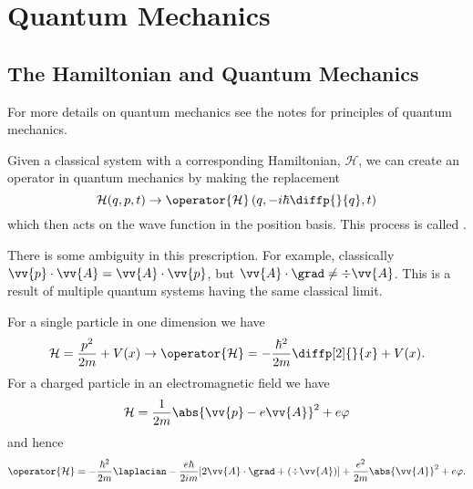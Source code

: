 \documentclass[fleqn]{NotesClass}
\newcommand*{\hamiltonian}{\mathcal{H}}
\begin{document}
    \section{Quantum Mechanics}
    \subsection{The Hamiltonian and Quantum Mechanics}
    \begin{rmk}
        For more details on quantum mechanics see the notes for principles of quantum mechanics.
    \end{rmk}
    Given a classical system with a corresponding Hamiltonian, \(\hamiltonian\), we can create an operator in quantum mechanics by making the replacement
    \begin{equation}
        \hamiltonian(q, p, t) \to \operator{\hamiltonian}\left( q, -i\hbar \diffp{}{q}, t \right)
    \end{equation}
    which then acts on the wave function in the position basis.
    This process is called .
    
    \begin{rmk}
        There is some ambiguity in this prescription.
        For example, classically \(\vv{p} \cdot \vv{A} = \vv{A} \cdot \vv{p}\), but \(\vv{A} \cdot \grad \ne \div\vv{A}\).
        This is a result of multiple quantum systems having the same classical limit.
    \end{rmk}
    
    \begin{exm}{}{}
        For a single particle in one dimension we have
        \begin{equation}
            \hamiltonian = \frac{p^2}{2m} + V(x) \to \operator{\hamiltonian} = -\frac{\hbar^2}{2m}\diffp[2]{}{x} + V(x).
        \end{equation}
        For a charged particle in an electromagnetic field we have
        \begin{equation}
            \hamiltonian = \frac{1}{2m} \abs{\vv{p} - e\vv{A}}^2 + e\varphi
        \end{equation}
        and hence
        \begin{equation}
            \operator{\hamiltonian} = -\frac{\hbar^2}{2m}\laplacian - \frac{e\hbar}{2im}[2\vv{A} \cdot \grad + (\div \vv{A})] + \frac{e^2}{2m} \abs{\vv{A}}^2 + e\varphi.
        \end{equation}
    \end{exm}
    
\end{document}
